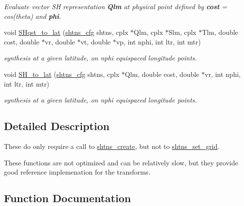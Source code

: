 \begin{DoxyCompactItemize}
\begin{DoxyCompactList}\small\item\em Evaluate vector S\+H representation {\bfseries Qlm} at physical point defined by {\bfseries cost} = cos(theta) and {\bfseries phi}. \end{DoxyCompactList}\item 
void \hyperlink{group__local_ga7a490f355da08822e437ff6093288e86}{S\+Hqst\+\_\+to\+\_\+lat} (\hyperlink{shtns_8h_ab7bd78e5cbeb4ed18782d018195fde00}{shtns\+\_\+cfg} shtns, cplx $\ast$Qlm, cplx $\ast$Slm, cplx $\ast$Tlm, double cost, double $\ast$vr, double $\ast$vt, double $\ast$vp, int nphi, int ltr, int mtr)
\begin{DoxyCompactList}\small\item\em synthesis at a given latitude, on nphi equispaced longitude points. \end{DoxyCompactList}\item 
void \hyperlink{group__local_ga19f8e3040d8f37c994ca73573e76b738}{S\+H\+\_\+to\+\_\+lat} (\hyperlink{shtns_8h_ab7bd78e5cbeb4ed18782d018195fde00}{shtns\+\_\+cfg} shtns, cplx $\ast$Qlm, double cost, double $\ast$vr, int nphi, int ltr, int mtr)
\begin{DoxyCompactList}\small\item\em synthesis at a given latitude, on nphi equispaced longitude points. \end{DoxyCompactList}\end{DoxyCompactItemize}


\subsection{Detailed Description}
These do only require a call to \hyperlink{group__init_ga54b088013246e361b3c7387ac17bf9c1}{shtns\+\_\+create}, but not to \hyperlink{group__init_ga504eedd43b90d435fc55f7e22e18c44e}{shtns\+\_\+set\+\_\+grid}. 

These functions are not optimized and can be relatively slow, but they provide good reference implemenation for the transforms. 

\subsection{Function Documentation}
\hypertarget{group__local_ga19f8e3040d8f37c994ca73573e76b738}{}
